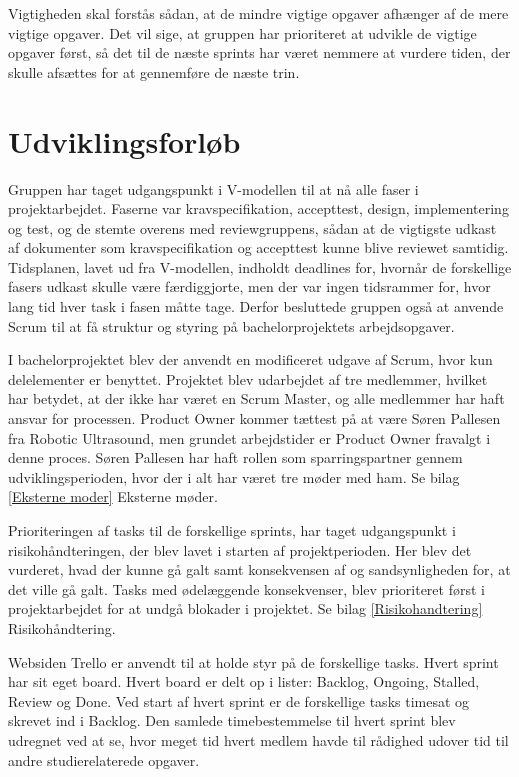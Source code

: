 Vigtigheden skal forstås sådan, at de mindre vigtige opgaver afhænger af de mere vigtige opgaver. 
Det vil sige, at gruppen har prioriteret at udvikle de vigtige opgaver først, så det til de næste sprints har været nemmere at vurdere tiden, der skulle afsættes for at gennemføre de næste trin.
 
\section{Udviklingsforløb} \label{Udviklingsforlob}
Gruppen har taget udgangspunkt i V-modellen til at nå alle faser i projektarbejdet. Faserne var kravspecifikation, accepttest, design, implementering og test, og de stemte overens med reviewgruppens, sådan at de vigtigste udkast af dokumenter som kravspecifikation og accepttest kunne blive reviewet samtidig. Tidsplanen, lavet ud fra V-modellen, indholdt deadlines for, hvornår de forskellige fasers udkast skulle være færdiggjorte, men der var ingen tidsrammer for, hvor lang tid hver task i fasen måtte tage. Derfor besluttede gruppen også at anvende Scrum til at få struktur og styring på bachelorprojektets arbejdsopgaver.

I bachelorprojektet blev der anvendt en modificeret udgave af Scrum, hvor kun delelementer er benyttet. Projektet blev udarbejdet af tre medlemmer, hvilket har betydet, at der ikke har været en Scrum Master, og alle medlemmer har haft ansvar for processen. Product Owner kommer tættest på at være Søren Pallesen fra Robotic Ultrasound, men grundet arbejdstider er Product Owner fravalgt i denne proces. Søren Pallesen har haft rollen som sparringspartner gennem udviklingsperioden, hvor der i alt har været tre møder med ham. Se bilag \ref{Eksterne moder} Eksterne møder. 

Prioriteringen af tasks til de forskellige sprints, har taget udgangspunkt i risikohåndteringen, der blev lavet i starten af projektperioden. Her blev det vurderet, hvad der kunne gå galt samt konsekvensen af og sandsynligheden for, at det ville gå galt. Tasks med ødelæggende konsekvenser, blev prioriteret først i projektarbejdet for at undgå blokader i projektet. Se bilag \ref{Risikohandtering} Risikohåndtering.  

Websiden Trello er anvendt til at holde styr på de forskellige tasks. Hvert sprint har sit eget board. Hvert board er delt op i lister: Backlog, Ongoing, Stalled, Review og Done. Ved start af hvert sprint er de forskellige tasks timesat og skrevet ind i Backlog. Den samlede timebestemmelse til hvert sprint blev udregnet ved at se, hvor meget tid hvert medlem havde til rådighed udover tid til andre studierelaterede opgaver. 

